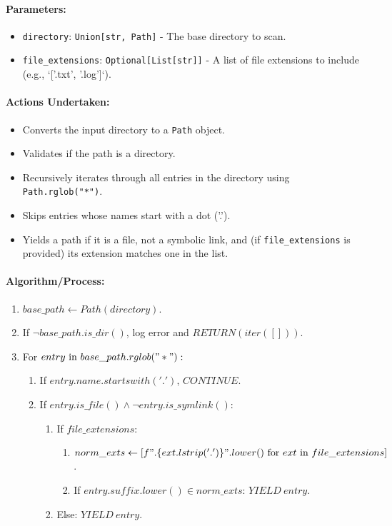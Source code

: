 \documentclass{article}
\begin{document}
\paragraph{Parameters:}
\begin{itemize}
    \item \texttt{directory}: \texttt{Union[str, Path]} - The base directory to scan.
    \item \texttt{file\_extensions}: \texttt{Optional[List[str]]} - A list of file extensions to include (e.g., `['.txt', '.log']`).
\end{itemize}
\paragraph{Actions Undertaken:}
\begin{itemize}
    \item Converts the input directory to a \texttt{Path} object.
    \item Validates if the path is a directory.
    \item Recursively iterates through all entries in the directory using \texttt{Path.rglob("*")}.
    \item Skips entries whose names start with a dot ('.').
    \item Yields a path if it is a file, not a symbolic link, and (if \texttt{file\_extensions} is provided) its extension matches one in the list.
\end{itemize}
\paragraph{Algorithm/Process:}
\begin{enumerate}
    \item $base\_path \leftarrow Path(directory)$.
    \item If $\neg base\_path.is\_dir()$, log error and $RETURN(iter([]))$.
    \item For $entry \text{ in } base\_path.rglob("*"):$
    \begin{enumerate}
        \item If $entry.name.startswith('.') $, $CONTINUE$.
        \item If $entry.is\_file() \land \neg entry.is\_symlink()$:
        \begin{enumerate}
            \item If $file\_extensions$:
                \begin{enumerate}
                    \item $norm\_exts \leftarrow [f".\{ext.lstrip('.')\}".lower() \text{ for } ext \text{ in } file\_extensions]$.
                    \item If $entry.suffix.lower() \in norm\_exts$: $YIELD \ entry$.
                \end{enumerate}
            \item Else: $YIELD \ entry$.
        \end{enumerate}
    \end{enumerate}
\end{enumerate}
\end{document}
